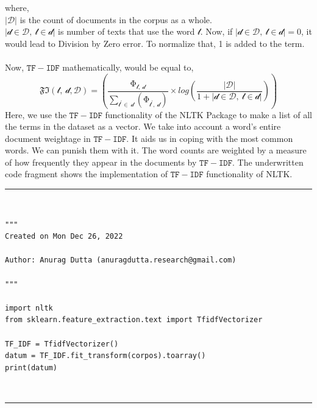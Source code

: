 \documentclass[sn-basic]{sn-jnl}%
\theoremstyle{thmstyleone}%
\theoremstyle{thmstyletwo}%
\theoremstyle{thmstylethree}%
\begin{document}
where, \\$\left\lvert\mathcal{D}\right\rvert$ is the count of documents in the corpus as a whole.\\
$\left\lvert\mathcal{d}\in\mathcal{D},\ \mathcal{t}\in\mathcal{d}\right\rvert$ is number of texts that use the word $\mathcal{t}$. Now, if $\left\lvert\mathcal{d}\in\mathcal{D},\ \mathcal{t}\in\mathcal{d}\right\rvert = 0$, it would lead to Division by Zero error. To normalize that, 1 is added to the term. \\\\
Now, $\mathtt{TF-IDF}$ mathematically, would be equal to, 
\begin{equation}
\mathfrak{FI}(\mathcal{t},\ \mathcal{d},\mathcal{D})=\left(\frac{\mathrm{\Phi}_{\mathcal{t},\ \mathcal{d}}}{\sum_{\mathcal{t}^\prime\in\ \mathcal{d}}\left(\mathrm{\Phi}_{\mathcal{t}^\prime,\ \mathcal{d}}\right)}\times l o g{\left(\frac{\left\lvert\mathcal{D}\right\rvert}{1+\left\lvert\mathcal{d}\in\mathcal{D},\ \mathcal{t}\in\mathcal{d}\right\rvert}\right)}\right)
\end{equation}
Here, we use the $\mathtt{TF-IDF}$ functionality of the NLTK Package to make a list of all the terms in the dataset as a vector. We take into account a word's entire document weightage in $\mathtt{TF-IDF}$. It aids us in coping with the most common words. We can punish them with it. The word counts are weighted by a measure of how frequently they appear in the documents by $\mathtt{TF-IDF}$.
The underwritten code fragment shows the implementation of $\mathtt{TF-IDF}$ functionality of NLTK. \\
\hrule \textbf{\\}
\begin{verbatim}
"""
Created on Mon Dec 26, 2022

Author: Anurag Dutta (anuragdutta.research@gmail.com)

"""

import nltk
from sklearn.feature_extraction.text import TfidfVectorizer

TF_IDF = TfidfVectorizer()
datum = TF_IDF.fit_transform(corpos).toarray()
print(datum)
\end{verbatim}
\textbf{\\}
\hrule
\end{document}
